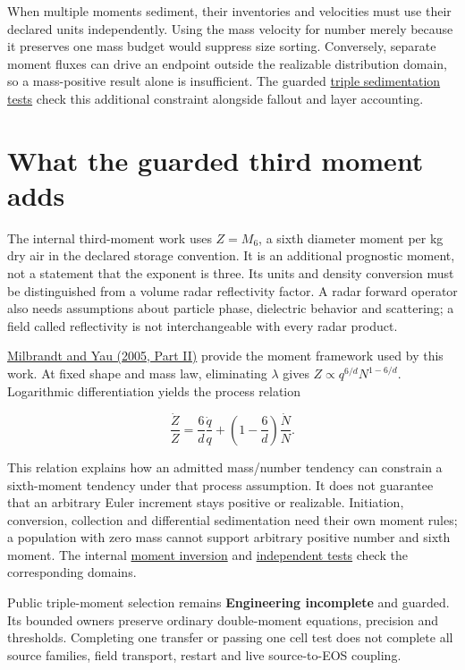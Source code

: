 \documentclass[
  11pt,
]{report}
\begin{document}
When multiple moments sediment, their inventories and velocities must
use their declared units independently. Using the mass velocity for
number merely because it preserves one mass budget would suppress size
sorting. Conversely, separate moment fluxes can drive an endpoint
outside the realizable distribution domain, so a mass-positive result
alone is insufficient. The guarded
\href{../tests/physics/test_milbrandt_triple_sedimentation.cpp}{triple
sedimentation tests} check this additional constraint alongside fallout
and layer accounting.

\section{What the guarded third moment
adds}\label{what-the-guarded-third-moment-adds}

The internal third-moment work uses \(Z=M_6\), a sixth diameter moment
per kg dry air in the declared storage convention. It is an additional
prognostic moment, not a statement that the exponent is three. Its units
and density conversion must be distinguished from a volume radar
reflectivity factor. A radar forward operator also needs assumptions
about particle phase, dielectric behavior and scattering; a field called
reflectivity is not interchangeable with every radar product.

\href{https://www2.mmm.ucar.edu/wrf/users/physics/phys_refs/MICRO_PHYS/Milbrandt_Yau_part2.pdf}{Milbrandt
and Yau (2005, Part II)} provide the moment framework used by this work.
At fixed shape and mass law, eliminating \(\lambda\) gives
\(Z\propto q^{6/d}N^{1-6/d}\). Logarithmic differentiation yields the
process relation

\[\frac{\dot Z}{Z}
=\frac{6}{d}\frac{\dot q}{q}
 +\left(1-\frac{6}{d}\right)\frac{\dot N}{N}.\]

This relation explains how an admitted mass/number tendency can
constrain a sixth-moment tendency under that process assumption. It does
not guarantee that an arbitrary Euler increment stays positive or
realizable. Initiation, conversion, collection and differential
sedimentation need their own moment rules; a population with zero mass
cannot support arbitrary positive number and sixth moment. The internal
\href{../src/microphysics/schemes/milbrandt/triple_moment.cpp}{moment
inversion} and
\href{../tests/physics/test_milbrandt_triple_moment_candidate.cpp}{independent
tests} check the corresponding domains.

Public triple-moment selection remains \textbf{Engineering incomplete}
and guarded. Its bounded owners preserve ordinary double-moment
equations, precision and thresholds. Completing one transfer or passing
one cell test does not complete all source families, field transport,
restart and live source-to-EOS coupling.
\end{document}
